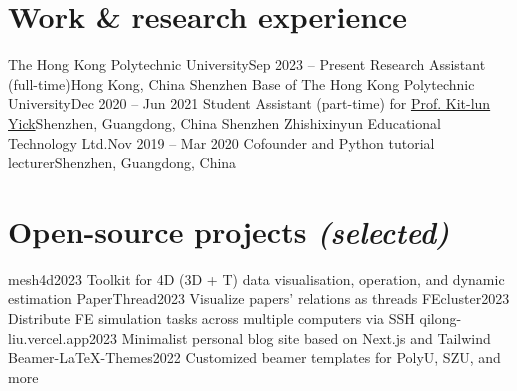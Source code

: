 \documentclass[letterpaper,11pt]{article}
\begin{document}
    \section{Work \& research experience}

    \resumeColumnsStart
        \resumeEntry
            {The Hong Kong Polytechnic University}{Sep 2023 -- Present}
            {Research Assistant (full-time)}{Hong Kong, China}
        \resumeEntry
            {Shenzhen Base of The Hong Kong Polytechnic University}{Dec 2020 -- Jun 2021}
            {Student Assistant (part-time) for \href{https://research.polyu.edu.hk/en/persons/kit-lun-yick}{Prof. Kit-lun Yick}}{Shenzhen, Guangdong, China}
        \resumeEntry
            {Shenzhen Zhishixinyun Educational Technology Ltd.}{Nov 2019 -- Mar 2020}
            {Cofounder and Python tutorial lecturer}{Shenzhen, Guangdong, China}
    \resumeColumnsEnd

    \section{Open-source projects \emph{(selected)}}

    \resumeColumnsStart
        \resumeEntry
            {mesh4d}{2023}
            {Toolkit for 4D (3D + T) data visualisation, operation, and dynamic estimation}{}
        \resumeEntry
            {PaperThread}{2023}
            {Visualize papers' relations as threads}{}
        \resumeEntry
            {FEcluster}{2023}
            {Distribute FE simulation tasks across multiple computers via SSH}{}
        \resumeEntry
            {qilong-liu.vercel.app}{2023}
            {Minimalist personal blog site based on Next.js and Tailwind}{}
        \resumeEntry
            {Beamer-LaTeX-Themes}{2022}
            {Customized beamer templates for PolyU, SZU, and more}{}
    \resumeColumnsEnd
\end{document}
